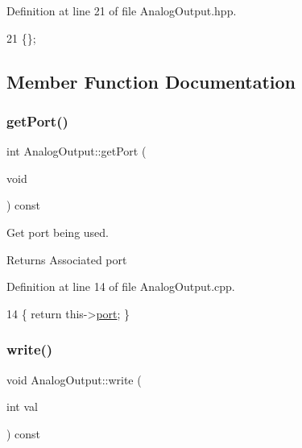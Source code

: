Definition at line 21 of file Analog\+Output.\+hpp.


\begin{DoxyCode}
21 \{\};
\end{DoxyCode}


\subsection{Member Function Documentation}
\mbox{\label{class_analog_output_abc1f7308376f4b0f0cb7bb34802ce9e3}} 
\subsubsection{\texorpdfstring{get\+Port()}{getPort()}}
{\footnotesize\ttfamily int Analog\+Output\+::get\+Port (\begin{DoxyParamCaption}\item[{void}]{ }\end{DoxyParamCaption}) const}



Get port being used. 

\begin{DoxyReturn}{Returns}
Associated port 
\end{DoxyReturn}


Definition at line 14 of file Analog\+Output.\+cpp.


\begin{DoxyCode}
14 \{ \textcolor{keywordflow}{return} this->\hyperlink{class_analog_output_a52a084ec21b0e7f4cf9eb29af2fd103c}{port}; \}
\end{DoxyCode}
\mbox{\label{class_analog_output_a16fc372acf8e7d7525d119804b374406}} 
\subsubsection{\texorpdfstring{write()}{write()}}
{\footnotesize\ttfamily void Analog\+Output\+::write (\begin{DoxyParamCaption}\item[{int}]{val }\end{DoxyParamCaption}) const}



